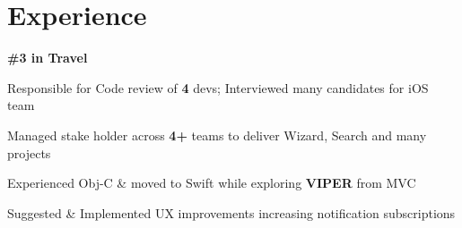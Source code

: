 \documentclass[]{Kauts}
\begin{document}
\begin{minipage}[t]{0.69\textwidth} 


\section{Experience}
 \hfill \textbf{\#3 in Travel}\\
\vspace{\topsep}
\begin{tightemize}
\item Responsible for Code review of \textbf{4} devs; Interviewed many candidates for iOS team\\
\item Managed stake holder across \textbf{4+} teams to deliver Wizard, Search and many projects\\
\item Experienced Obj-C \& moved to Swift while exploring \textbf{VIPER} from MVC\\
\item Suggested \& Implemented UX improvements increasing notification subscriptions\\
\end{tightemize}
\sectionsep


\end{minipage}
\end{document}
